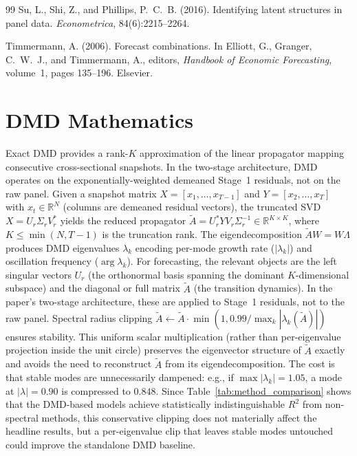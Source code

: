 \documentclass[11pt,a4paper]{article}
\newcommand{\R}{\mathbb{R}}
\begin{document}
\begin{thebibliography}{99}
Su, L., Shi, Z., and Phillips, P.~C.~B. (2016).
\newblock Identifying latent structures in panel data.
\newblock \emph{Econometrica}, 84(6):2215--2264.

Timmermann, A. (2006).
\newblock Forecast combinations.
\newblock In Elliott, G., Granger, C.~W.~J., and Timmermann, A., editors,
  \emph{Handbook of Economic Forecasting}, volume~1, pages 135--196. Elsevier.

\end{thebibliography}

\newpage
\appendix
\renewcommand{\thesection}{\Alph{section}}

\section{DMD Mathematics}
\label{app:dmd}

Exact DMD \citep{kutz2016dynamic} provides a rank-$K$ approximation of the linear propagator mapping consecutive cross-sectional snapshots. In the two-stage architecture, DMD operates on the exponentially-weighted demeaned Stage~1 residuals, not on the raw panel. Given a snapshot matrix $X = [x_1, \ldots, x_{T-1}]$ and $Y = [x_2, \ldots, x_T]$ with $x_t \in \R^N$ (columns are demeaned residual vectors), the truncated SVD $X = U_r \Sigma_r V_r^*$ yields the reduced propagator $\tilde{A} = U_r^* Y V_r \Sigma_r^{-1} \in \R^{K \times K}$, where $K \leq \min(N, T-1)$ is the truncation rank. The eigendecomposition $\tilde{A} W = W \Lambda$ produces DMD eigenvalues $\lambda_k$ encoding per-mode growth rate ($|\lambda_k|$) and oscillation frequency ($\arg \lambda_k$). For forecasting, the relevant objects are the left singular vectors $U_r$ (the orthonormal basis spanning the dominant $K$-dimensional subspace) and the diagonal or full matrix $\tilde{A}$ (the transition dynamics). In the paper's two-stage architecture, these are applied to Stage~1 residuals, not to the raw panel. Spectral radius clipping $\tilde{A} \leftarrow \tilde{A} \cdot \min(1, 0.99 / \max_k |\lambda_k(\tilde{A})|)$ ensures stability. This uniform scalar multiplication (rather than per-eigenvalue projection inside the unit circle) preserves the eigenvector structure of $\tilde{A}$ exactly and avoids the need to reconstruct $\tilde{A}$ from its eigendecomposition. The cost is that stable modes are unnecessarily dampened: e.g., if $\max |\lambda_k| = 1.05$, a mode at $|\lambda| = 0.90$ is compressed to $0.848$. Since Table~\ref{tab:method_comparison} shows that the DMD-based models achieve statistically indistinguishable $R^2$ from non-spectral methods, this conservative clipping does not materially affect the headline results, but a per-eigenvalue clip that leaves stable modes untouched could improve the standalone DMD baseline.
\end{document}

